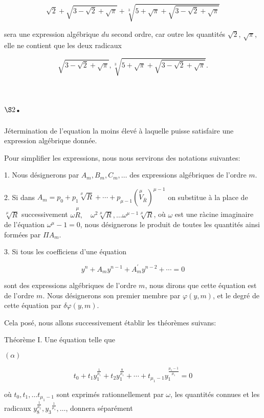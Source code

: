 \documentclass{article}
\begin{document}
\[
\sqrt{2}+\sqrt{3-\sqrt{2}+\sqrt{\pi}}+\sqrt[3]{5+\sqrt{\pi}+\sqrt{3-\sqrt{2}+\sqrt{\pi}}}
\]

sera une expression algébrique \(d u\) second ordre, car outre les quantités \(\sqrt{2}\), \(\sqrt{\pi}\), elle ne contient que les deux radicaux

\[
\sqrt{3-\sqrt{2}+\sqrt{\pi}}, \sqrt[3]{5+\sqrt{\pi}+\sqrt{3-\sqrt{2}+\sqrt{\pi}}} .
\]

\section*{\(\S 2\).}

Jétermination de l'equation la moins élevé à laquelle puisse satisfaire une expression algébrique donnée.

Pour simplifier les expressions, nous nous servirons des notations suivantes:

1. Nous désignerons par \(A_{m}, B_{m}, C_{m}, \ldots\) des expressions algébriques de l'ordre \(m\).

2. Si dans \(A_{m}=p_{0}+p_{1} \sqrt[\mu]{\bar{R}}+\cdots+p_{\mu-1}\left(\stackrel{\mu}{V}_{\bar{R}}\right)^{\mu-1}\) on substitue à la place de \(\sqrt[\mu]{R}\) successivement \(\omega \stackrel{\mu}{R}, \quad \omega^{2} \sqrt[\mu]{R}, \ldots \omega^{\mu-1} \sqrt[\mu]{R}\), où \(\omega\) est une ràcine imaginaire de l'équation \(\omega^{\mu}-1=0\), nous désignerons le produit de toutes les quantités ainsi formées par \(\Pi A_{m}\).

3. Si tous les coefficiens d'une équation

\[
y^{n}+A_{m} y^{n-1}+A_{m}^{\prime} y^{n-2}+\cdots=0
\]

sont des expressions algébriques de l'ordre \(m\), nous dirons que cette équation est de l'ordre \(m\). Nous désignerons son premier membre par \(\varphi(y, m)\), et le degré de cette équation par \(\delta \varphi(y, m)\).

Cela posé, nous allons successivement établir les théorèmes suivans:

Théorème I. Une équation telle que

\((\alpha)\)

\[
t_{0}+t_{1} y_{1}^{\frac{1}{\mu_{1}}}+t_{2} y_{1}^{\frac{8}{\mu_{1}}}+\cdots+t_{\mu_{1}-1} y_{1}^{\frac{\mu_{1}-1}{\mu_{1}}}=0
\]

où \(t_{0}, t_{1}, \ldots t_{\mu_{1}-1}\) sont exprimés rationnellement par \(\omega\), les quantités connues et les radicaux \(y_{8}^{\frac{1}{\mu_{2}}}, y_{3}{ }^{\frac{1}{\mu_{s}}}, \ldots\), donnera séparément
\end{document}
